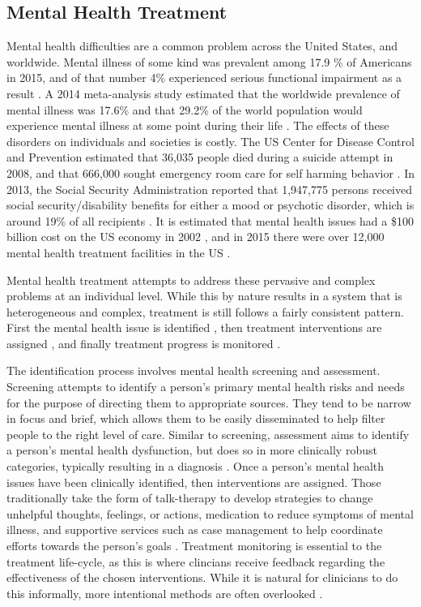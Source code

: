 \documentclass[sigconf]{acmart}
\begin{document}
\subsection{Mental Health Treatment}
Mental health difficulties are a common problem across the United States, and worldwide. Mental illness of some kind was prevalent among 17.9 \% of Americans in 2015, and of that number 4\% experienced serious functional impairment as a result \cite{nihmstats}. A 2014 meta-analysis study estimated that the worldwide prevalence of mental illness was 17.6\% and that 29.2\% of the world population would experience mental illness at some point during their life \cite{worldprev}. The effects of these disorders on individuals and societies is costly. The US Center for Disease Control and Prevention estimated that 36,035 people died during a suicide attempt in 2008, and that 666,000 sought emergency room care for self harming behavior \cite{cdcsuicide}. In 2013, the Social Security Administration reported that 1,947,775 persons received social security/disability benefits for either a mood or psychotic disorder, which is around 19\% of all recipients \cite{ssarecipients}. It is estimated that mental health issues had a \$100 billion cost on the US economy in 2002 \cite{nihmstats}, and in 2015 there were over 12,000 mental health treatment facilities in the US \cite{n-mhss2015}.

Mental health treatment attempts to address these pervasive and complex problems at an individual level. While this by nature results in a system that is heterogeneous and complex, treatment is still follows a fairly consistent pattern. First the mental health issue is identified \cite{apapractscreeassess}, then treatment interventions are assigned \cite{samhsatx}, and finally treatment progress is monitored \cite{progressmonitoring}.

The identification process involves mental health screening and assessment. Screening attempts to identify a person's primary mental health risks and needs for the purpose of directing them to appropriate sources. They tend to be narrow in focus and brief, which allows them to be easily disseminated to help filter people to the right level of care. Similar to screening, assessment aims to identify a person's mental health dysfunction, but does so in more clinically robust categories, typically resulting in a diagnosis \cite{apapractscreeassess}. 
Once a person's mental health issues have been clinically identified, then interventions are assigned. Those traditionally take the form of talk-therapy to develop strategies to change unhelpful thoughts, feelings, or actions, medication to reduce symptoms of mental illness, and supportive services such as case management to help coordinate efforts towards the person's goals \cite{samhsatx}.
Treatment monitoring is essential to the treatment life-cycle, as this is where clincians receive feedback regarding the effectiveness of the chosen interventions. While it is natural for clinicians to do this informally, more intentional methods are often overlooked \cite{progressmonitoring}.
\end{document}
